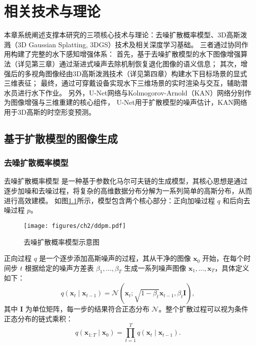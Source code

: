 
\chapter{相关技术与理论}
本章系统阐述支撑本研究的三项核心技术与理论：去噪扩散概率模型、3D高斯泼溅（3D Gaussian Splatting, 3DGS）技术及相关深度学习基础。
三者通过协同作用构建了完整的水下感知增强体系：
首先，基于去噪扩散模型的水下图像增强算法（详见第三章）通过渐进式噪声去除机制恢复退化图像的语义信息；
其次，增强后的多视角图像经由3D高斯泼溅技术（详见第四章）构建水下目标场景的显式三维表征；
最终，通过可穿戴设备实现水下三维场景的实时渲染与交互，辅助潜水员进行水下作业。
另外，U-Net网络与Kolmogorov-Arnold（KAN）网络分别作为图像增强与三维重建的核心组件，
U-Net用于扩散模型的噪声估计，KAN网络用于3D高斯的时空形变预测。


\section{基于扩散模型的图像生成}

\subsection{去噪扩散概率模型}
去噪扩散概率模型\cite{pre_ddpm}\cite{ddpm} 是一种基于参数化马尔可夫链的生成模型，其核心思想是通过逐步加噪和去噪过程，将复杂的高维数据分布分解为一系列简单的高斯分布，从而进行高效建模。
如图\ref{img:ddpm}所示，模型包含两个核心部分：正向加噪过程 $q$ 和后向去噪过程 $p$。
\begin{figure}
    \centering
    \texttt{[image: figures/ch2/ddpm.pdf]}
    \vspace{2mm}
    \caption{去噪扩散概率模型示意图}
    \label{img:ddpm}
\end{figure}

正向过程 $q$ 是一个逐步添加高斯噪声的过程，其从干净的图像 $\mathbf{x}_0$ 开始，在每个时间步 $t$ 根据给定的噪声方差表 $\beta_1, \dots, \beta_T$ 生成一系列噪声图像 $\mathbf{x}_1, \dots, \mathbf{x}_T$，具体定义如下：
\begin{equation}
    \label{eq:q_1step}
    q\left(\mathbf{x}_t \mid \mathbf{x}_{t-1}\right)=\mathcal{N}\left(\mathbf{x}_t ; \sqrt{1-\beta_t} \mathbf{x}_{t-1}, \beta_t \mathbf{I}\right),
\end{equation}
其中 $\mathbf{I}$ 为单位矩阵，每一步的结果符合正态分布 $\mathcal{N}$。整个扩散过程可以视为条件正态分布的链式乘积：
\begin{equation}
    q\left(\mathbf{x}_{1: T} \mid \mathbf{x}_0\right)=\prod_{t=1}^T q\left(\mathbf{x}_t \mid \mathbf{x}_{t-1}\right).
\end{equation}

